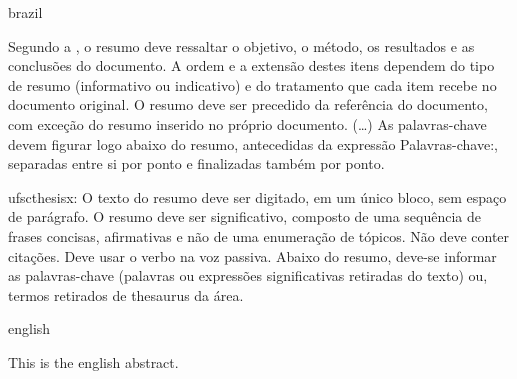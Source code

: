 %
\begin{otherlanguage*}{brazil}
\begin{resumo}

    Segundo a , o resumo deve ressaltar o
    objetivo, o método, os resultados e as conclusões do documento. A ordem e a extensão
    destes itens dependem do tipo de resumo (informativo ou indicativo) e do
    tratamento que cada item recebe no documento original. O resumo deve ser
    precedido da referência do documento, com exceção do resumo inserido no
    próprio documento. (\ldots) As palavras-chave devem figurar logo abaixo do
    resumo, antecedidas da expressão Palavras-chave:, separadas entre si por
    ponto e finalizadas também por ponto.

    ufscthesisx:
    O texto do resumo deve ser digitado, em um único bloco, sem espaço de parágrafo. O resumo deve
    ser significativo, composto de uma sequência de frases concisas, afirmativas e não de uma
    enumeração de tópicos. Não deve conter citações. Deve usar o verbo na voz passiva. Abaixo do
    resumo, deve-se informar as palavras-chave (palavras ou expressões significativas retiradas do
    texto) ou, termos retirados de thesaurus da área. \showfont


\end{resumo}
\end{otherlanguage*}


\begin{otherlanguage*}{english}
\begin{resumo}[Abstract]

    This is the english abstract.


\end{resumo}
\end{otherlanguage*}




